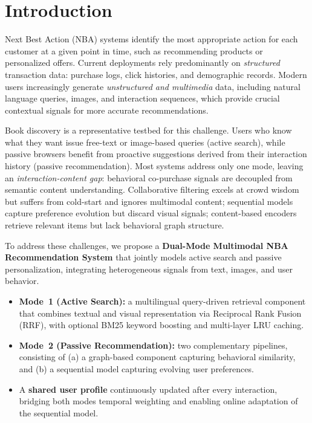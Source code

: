 \section{Introduction}
\label{sec:intro}

Next Best Action (NBA) systems identify the most appropriate action for each
customer at a given point in time, such as recommending products or
personalized offers.
Current deployments rely predominantly on \emph{structured} transaction data:
purchase logs, click histories, and demographic records.
Modern users increasingly generate \emph{unstructured and multimedia} data,
including natural language queries, images, and interaction sequences, which
provide crucial contextual signals for more accurate recommendations.

Book discovery is a representative testbed for this challenge.
Users who know what they want issue free-text or image-based queries
(active search), while passive browsers benefit from proactive suggestions
derived from their interaction history (passive recommendation).
Most systems address only one mode, leaving an \emph{interaction-content gap}:
behavioral co-purchase signals are decoupled from semantic content understanding.
Collaborative filtering excels at crowd wisdom but suffers from cold-start
and ignores multimodal content; sequential models~\cite{kang2018self} capture
preference evolution but discard visual signals; content-based encoders retrieve
relevant items but lack behavioral graph structure.

To address these challenges, we propose a \textbf{Dual-Mode Multimodal NBA Recommendation System} that jointly models active search and passive personalization, integrating heterogeneous signals from text, images, and user behavior.
\begin{itemize}
  \item \textbf{Mode~1 (Active Search):}  a multilingual query-driven
        retrieval component that combines textual and visual representation via Reciprocal Rank Fusion (RRF), with optional BM25 keyword boosting and multi-layer LRU caching.
  \item \textbf{Mode~2 (Passive Recommendation):} two complementary pipelines, consisting of (a) a graph-based component capturing behavioral similarity, and (b) a sequential model capturing evolving user preferences.
  \item A \textbf{shared user profile} continuously updated after every
        interaction, bridging both modes  temporal weighting and
        enabling online adaptation of the sequential model.
\end{itemize}

